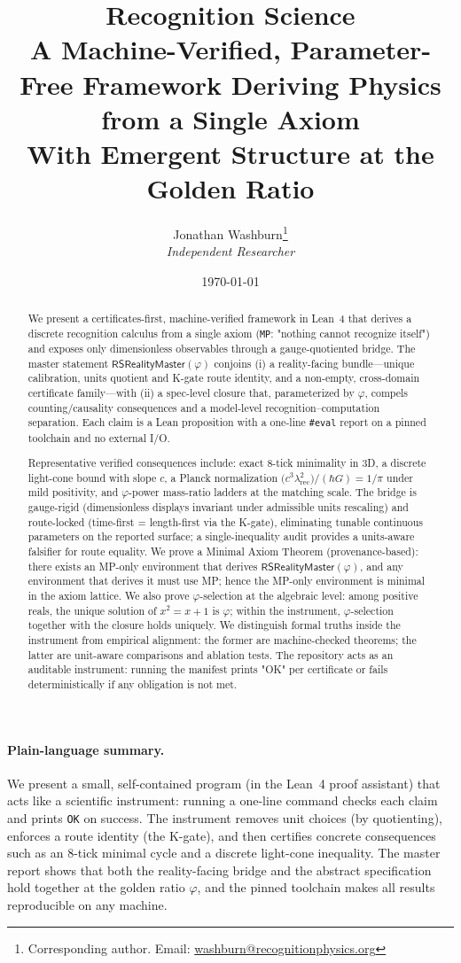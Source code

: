 \documentclass[11pt,a4paper,twoside]{article}
\title{%
    \vspace{-2em}%
    {\huge\bfseries Recognition Science}\\[1em]
    {\Large A Machine-Verified, Parameter-Free Framework Deriving Physics from a Single Axiom}\\[0.8em]
    {\large With Emergent Structure at the Golden Ratio}\\[1.5em]
}
\author{
    Jonathan Washburn\thanks{Corresponding author. Email: \href{mailto:washburn@recognitionphysics.org}{washburn@recognitionphysics.org}}\\
    \textit{Independent Researcher}
}
\date{\today}
\numberwithin{equation}{section}
\theoremstyle{customthm}
\theoremstyle{customdef}
\theoremstyle{customrem}
\begin{document}
\maketitle

\begin{abstract}
\noindent We present a certificates-first, machine-verified framework in Lean~4 that derives a discrete recognition calculus from a single axiom (\texttt{MP}: "nothing cannot recognize itself") and exposes only dimensionless observables through a gauge-quotiented bridge. The master statement $\mathsf{RSRealityMaster}(\varphi)$ conjoins (i) a reality-facing bundle—unique calibration, units quotient and K-gate route identity, and a non-empty, cross-domain certificate family—with (ii) a spec-level closure that, parameterized by $\varphi$, compels counting/causality consequences and a model-level recognition–computation separation. Each claim is a Lean proposition with a one-line \texttt{\#eval} report on a pinned toolchain and no external I/O.

Representative verified consequences include: exact 8-tick minimality in 3D, a discrete light-cone bound with slope $c$, a Planck normalization $\big(c^3\lambda_{\mathrm{rec}}^2\big)/(\hbar G)=1/\pi$ under mild positivity, and $\varphi$-power mass-ratio ladders at the matching scale. The bridge is gauge-rigid (dimensionless displays invariant under admissible units rescaling) and route-locked (time-first = length-first via the K-gate), eliminating tunable continuous parameters on the reported surface; a single-inequality audit provides a units-aware falsifier for route equality. We prove a Minimal Axiom Theorem (provenance-based): there exists an MP-only environment that derives $\mathsf{RSRealityMaster}(\varphi)$, and any environment that derives it must use MP; hence the MP-only environment is minimal in the axiom lattice. We also prove $\varphi$-selection at the algebraic level: among positive reals, the unique solution of $x^2 = x + 1$ is $\varphi$; within the instrument, $\varphi$-selection together with the closure holds uniquely. We distinguish formal truths inside the instrument from empirical alignment: the former are machine-checked theorems; the latter are unit-aware comparisons and ablation tests. The repository acts as an auditable instrument: running the manifest prints "OK" per certificate or fails deterministically if any obligation is not met.
\end{abstract}

\paragraph{Plain-language summary.} We present a small, self-contained program (in the Lean~4 proof assistant) that acts like a scientific instrument: running a one-line command checks each claim and prints \texttt{OK} on success. The instrument removes unit choices (by quotienting), enforces a route identity (the K-gate), and then certifies concrete consequences such as an 8-tick minimal cycle and a discrete light-cone inequality. The master report shows that both the reality-facing bridge and the abstract specification hold together at the golden ratio $\varphi$, and the pinned toolchain makes all results reproducible on any machine.
\end{document}
